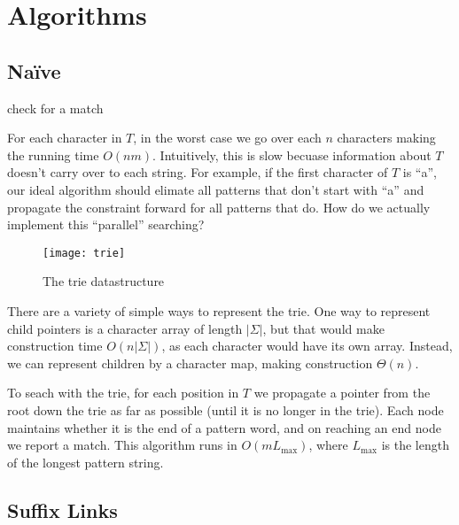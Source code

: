 \documentclass[11pt, oneside]{article}
\begin{document}
\newpage

\section{Algorithms}
\subsection{Naïve}

\begin{algorithm}
  \begin{algorithmic}[h!]
            \State check for a match
          \EndFor
      \EndFor
    \EndProcedure
  \end{algorithmic}
\end{algorithm}

For each character in \( T \), in the worst case we go over each \( n \)
characters making the running time \( O(nm) \). Intuitively, this is slow
becuase information about \( T \) doesn't carry over to each string.
For example, if the first character of \( T \) is ``a'', our ideal algorithm should
elimate all patterns that don't start with ``a'' and propagate the constraint
forward for all patterns that do. How do we actually implement this ``parallel'' searching?

\begin{figure}[h!]
\centering
\texttt{[image: trie]}
\caption{The trie datastructure}
\end{figure}

There are a variety of simple ways to represent the trie.
One way to represent child pointers is a character array of length \( |\Sigma| \),
but that would make construction time \( O(n |\Sigma|) \), as each character would have its own array.
Instead, we can represent children by a character map, making construction \( \Theta(n) \).

To seach with the trie, for each position in \( T \) we propagate a pointer from the root down the trie as far as possible (until it is no longer in the trie).
Each node maintains whether it is the end of a pattern word, and on reaching an end node we report a match.
This algorithm runs in \( O(m L_\text{max}) \), where \( L_\text{max} \) is the length of the longest pattern string.

\subsection{Suffix Links}
\end{document}
